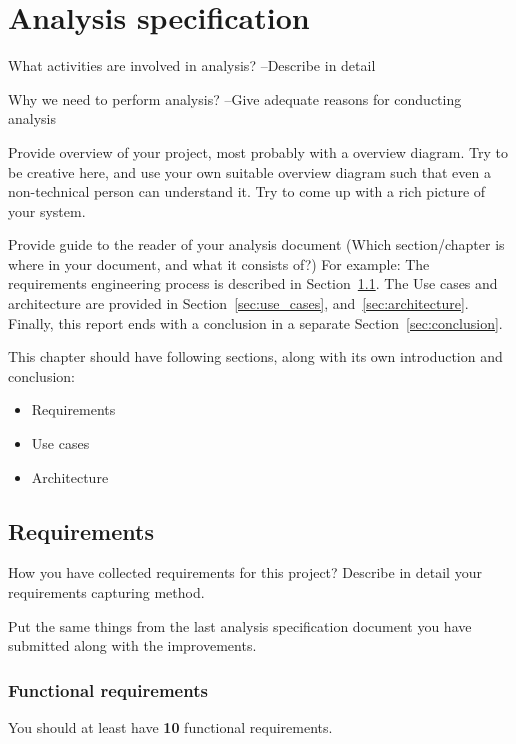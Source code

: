 
\chapter{Analysis specification} %
\label{cha:analysis}

What activities are involved in analysis? --Describe in detail

Why we need to perform analysis? --Give adequate reasons for conducting analysis

Provide overview of your project, most probably with a overview diagram. Try to be creative here, and use your own suitable overview diagram such that even a non-technical person can understand it. Try to come up with a rich picture of your system.

Provide guide to the reader of your analysis document (Which section/chapter is where in your document, and what it consists of?) For example: The requirements engineering process is described in Section~\ref{sec:requirements}. The Use cases and architecture are provided in Section~\ref{sec:use_cases}, and~\ref{sec:architecture}. Finally, this report ends with a conclusion in a separate Section~\ref{sec:conclusion}.

This chapter should have following sections, along with its own introduction and conclusion:
\begin{itemize}
  \item Requirements
  \item Use cases
  \item Architecture
\end{itemize}

\section{Requirements} %
\label{sec:requirements}

How you have collected requirements for this project? Describe in detail your requirements capturing method. 

Put the same things from the last analysis specification document you have submitted along with the improvements.

\subsection{Functional requirements} %
\label{sub:functional_requirements}

You should at least have \textbf{10} functional requirements.

